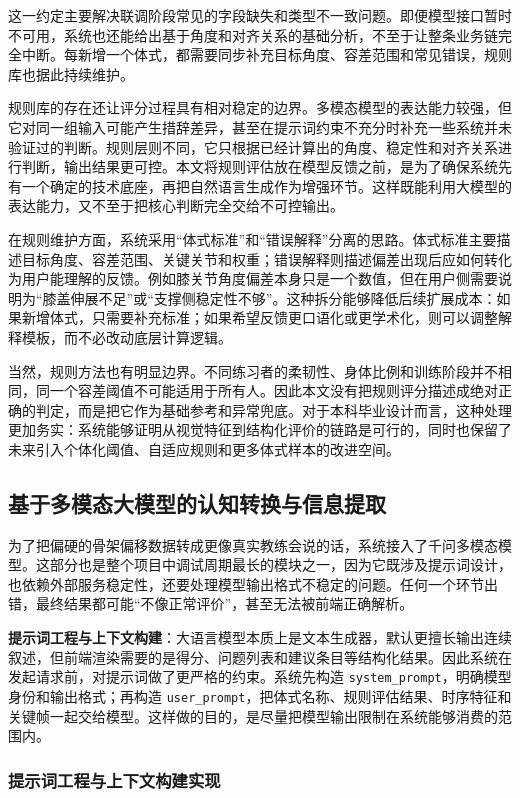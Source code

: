 这一约定主要解决联调阶段常见的字段缺失和类型不一致问题。即便模型接口暂时不可用，系统也还能给出基于角度和对齐关系的基础分析，不至于让整条业务链完全中断。每新增一个体式，都需要同步补充目标角度、容差范围和常见错误，规则库也据此持续维护。

规则库的存在还让评分过程具有相对稳定的边界。多模态模型的表达能力较强，但它对同一组输入可能产生措辞差异，甚至在提示词约束不充分时补充一些系统并未验证过的判断。规则层则不同，它只根据已经计算出的角度、稳定性和对齐关系进行判断，输出结果更可控。本文将规则评估放在模型反馈之前，是为了确保系统先有一个确定的技术底座，再把自然语言生成作为增强环节。这样既能利用大模型的表达能力，又不至于把核心判断完全交给不可控输出。

在规则维护方面，系统采用“体式标准”和“错误解释”分离的思路。体式标准主要描述目标角度、容差范围、关键关节和权重；错误解释则描述偏差出现后应如何转化为用户能理解的反馈。例如膝关节角度偏差本身只是一个数值，但在用户侧需要说明为“膝盖伸展不足”或“支撑侧稳定性不够”。这种拆分能够降低后续扩展成本：如果新增体式，只需要补充标准；如果希望反馈更口语化或更学术化，则可以调整解释模板，而不必改动底层计算逻辑。

当然，规则方法也有明显边界。不同练习者的柔韧性、身体比例和训练阶段并不相同，同一个容差阈值不可能适用于所有人。因此本文没有把规则评分描述成绝对正确的判定，而是把它作为基础参考和异常兜底。对于本科毕业设计而言，这种处理更加务实：系统能够证明从视觉特征到结构化评价的链路是可行的，同时也保留了未来引入个体化阈值、自适应规则和更多体式样本的改进空间。

\subsection{基于多模态大模型的认知转换与信息提取}
为了把偏硬的骨架偏移数据转成更像真实教练会说的话，系统接入了千问多模态模型。这部分也是整个项目中调试周期最长的模块之一，因为它既涉及提示词设计，也依赖外部服务稳定性，还要处理模型输出格式不稳定的问题。任何一个环节出错，最终结果都可能“不像正常评价”，甚至无法被前端正确解析。

\textbf{提示词工程与上下文构建}：大语言模型本质上是文本生成器，默认更擅长输出连续叙述，但前端渲染需要的是得分、问题列表和建议条目等结构化结果。因此系统在发起请求前，对提示词做了更严格的约束。系统先构造 \texttt{system\_prompt}，明确模型身份和输出格式；再构造 \texttt{user\_prompt}，把体式名称、规则评估结果、时序特征和关键帧一起交给模型。这样做的目的，是尽量把模型输出限制在系统能够消费的范围内。

\subsubsection{提示词工程与上下文构建实现}

